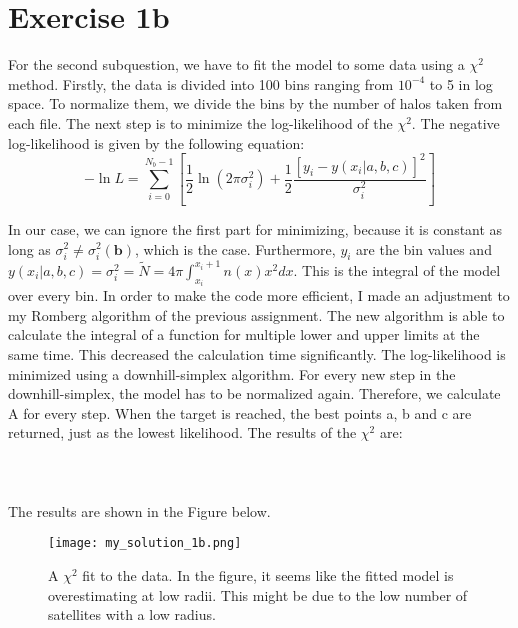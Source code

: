 \section{Exercise 1b}



For the second subquestion, we have to fit the model to some data using a $\chi^2$ method. Firstly, the data is divided into 100 bins ranging from $10^{-4}$ to 5 in log space. To normalize them, we divide the bins by the number of halos taken from each file. The next step is to minimize the log-likelihood of the $\chi^2$. The negative log-likelihood is given by the following equation: 
\begin{equation}
    -\ln{L} = \sum^{N_b-1}_{i = 0} \left[ \frac{1}{2} \ln(2\pi\sigma_i^2) +\frac{1}{2}\frac{[y_i - y(x_i|a,b,c)]^2}{\sigma_i^2}  \right]
\end{equation}

In our case, we can ignore the first part for minimizing, because it is constant as long as $\sigma_i^2 \neq \sigma_i^2(\textbf{b})$, which is the case. Furthermore, $y_i$ are the bin values and $y(x_i|a,b,c) = \sigma_i^2 = \tilde{N} = 4\pi\int^{x_i+1}_{x_i} n(x) x^2 dx$. This is the integral of the model over every bin. In order to make the code more efficient, I made an adjustment to my Romberg algorithm of the previous assignment. The new algorithm is able to calculate the integral of a function for multiple lower and upper limits at the same time. This decreased the calculation time significantly. The log-likelihood is minimized using a downhill-simplex algorithm. For every new step in the downhill-simplex, the model has to be normalized again. Therefore, we calculate A for every step. When the target is reached, the best points a, b and c are returned, just as the lowest likelihood. The results of the $\chi^2$ are: 
\\
\\

\\
\\
The results are shown in the Figure below.

\begin{figure}[h!]
  \centering
  \texttt{[image: my\_solution\_1b.png]}
  \caption{A $\chi^2$ fit to the data. In the figure, it seems like the fitted model is overestimating at low radii. This might be due to the low number of satellites with a low radius.}
\end{figure}


